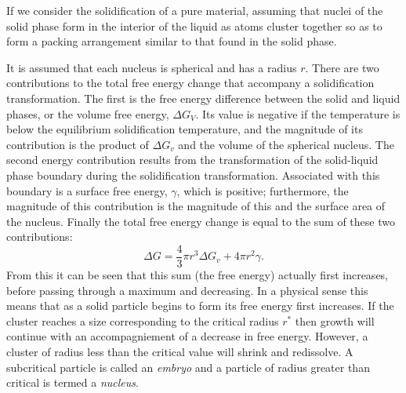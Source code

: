 If we consider the solidification of a pure material, assuming that nuclei of the solid phase form in the interior of the liquid as atoms cluster together so as to form a packing arrangement similar to that found in the solid phase.

It is assumed that each nucleus is spherical and has a radius $r$. There are two contributions to the total free energy change that accompany a solidification transformation. The first is the free energy difference between the solid and liquid phases, or the volume free energy, $\Delta G_V$. Its value is negative if the temperature is below the equilibrium solidification temperature, and the magnitude of its contribution is the product of $\Delta G_v$ and the volume of the spherical nucleus. The second energy contribution results from the transformation of the solid-liquid phase boundary during the solidification transformation. Associated with this boundary is a surface free energy, $\gamma$, which is positive; furthermore, the magnitude of this contribution is the magnitude of this and the surface area of the nucleus. Finally the total free energy change is equal to the sum of these two contributions:
\[ 
\Delta G = \frac{4}{3}\pi r^3 \Delta G_v + 4 \pi r^2 \gamma
.\]
From this it can be seen that this sum (the free energy) actually first increases, before passing through a maximum and decreasing. In a physical sense this means that as a solid particle begins to form its free energy first increases. If the cluster reaches a size corresponding to the critical radius $r^{*}$ then growth will continue with an accompagniement of a decrease in free energy. However, a cluster of radius less than the critical value will shrink and redissolve. A subcritical particle is called an \textit{embryo} and a particle of radius greater than critical is termed a \textit{nucleus}. 

